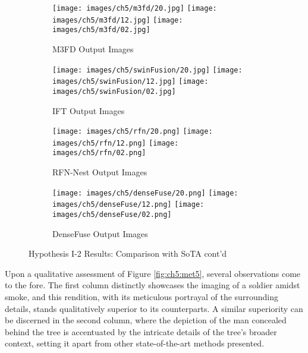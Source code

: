 \begin{figure}[htbp]
    \centering
    \begin{subfigure}[b]{\textwidth}
        \texttt{[image: images/ch5/m3fd/20.jpg]}
        \texttt{[image: images/ch5/m3fd/12.jpg]}
        \texttt{[image: images/ch5/m3fd/02.jpg]}
        \caption{M3FD\cite{liu2022target} Output Images}
        \label{fig:ch5:met9:m3fd}
    \end{subfigure}
    \vspace{0.01cm}
    \begin{subfigure}[b]{\textwidth}
        \texttt{[image: images/ch5/swinFusion/20.jpg]}
        \texttt{[image: images/ch5/swinFusion/12.jpg]}
        \texttt{[image: images/ch5/swinFusion/02.jpg]}
        \caption{IFT\cite{vs2022image} Output Images}
        \label{fig:ch5:met9:ift}
    \end{subfigure}
    \vspace{0.01cm}
    \begin{subfigure}[b]{\textwidth}
        \texttt{[image: images/ch5/rfn/20.png]}
        \texttt{[image: images/ch5/rfn/12.png]}
        \texttt{[image: images/ch5/rfn/02.png]}
        \caption{RFN-Nest\cite{li2021rfn} Output Images}
        \label{fig:ch5:met9:rfn}
    \end{subfigure}
    \vspace{0.01cm}
    \begin{subfigure}[b]{\textwidth}
        \texttt{[image: images/ch5/denseFuse/20.png]}
        \texttt{[image: images/ch5/denseFuse/12.png]}
        \texttt{[image: images/ch5/denseFuse/02.png]}
        \caption{DenseFuse\cite{li2019infrared} Output Images}
        \label{fig:ch5:met9:densefuse}
    \end{subfigure}
    \caption{Hypothesis I-2 Results: Comparison with SoTA cont'd}
\end{figure}

Upon a qualitative assessment of Figure \ref{fig:ch5:met5}, several observations come to the fore. The first column distinctly showcases the imaging of a soldier amidst smoke, and this rendition, with its meticulous portrayal of the surrounding details, stands qualitatively superior to its counterparts. A similar superiority can be discerned in the second column, where the depiction of the man concealed behind the tree is accentuated by the intricate details of the tree's broader context, setting it apart from other state-of-the-art methods presented.

